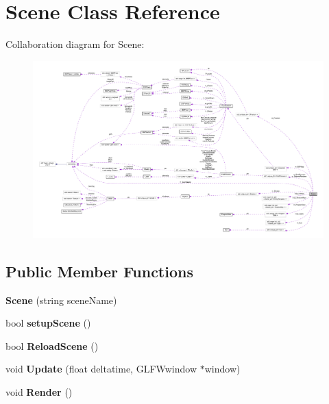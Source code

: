 \hypertarget{class_scene}{}\section{Scene Class Reference}
\label{class_scene}


Collaboration diagram for Scene\+:
\nopagebreak
\begin{figure}[H]
\begin{center}
\leavevmode
\includegraphics[width=350pt]{class_scene__coll__graph}
\end{center}
\end{figure}
\subsection*{Public Member Functions}
\begin{DoxyCompactItemize}
\item 
{\bfseries Scene} (string scene\+Name)\hypertarget{class_scene_a560981a699d1a725c5d80830fc32cd9a}{}\label{class_scene_a560981a699d1a725c5d80830fc32cd9a}

\item 
bool {\bfseries setup\+Scene} ()\hypertarget{class_scene_a6b806d01f6b3bcdfc47f6fb918ddfc75}{}\label{class_scene_a6b806d01f6b3bcdfc47f6fb918ddfc75}

\item 
bool {\bfseries Reload\+Scene} ()\hypertarget{class_scene_ae539c6790a579e51420966ffaefb0f84}{}\label{class_scene_ae539c6790a579e51420966ffaefb0f84}

\item 
void {\bfseries Update} (float deltatime, G\+L\+F\+Wwindow $\ast$window)\hypertarget{class_scene_ab12a3c580f885981907b5813a4b4b22b}{}\label{class_scene_ab12a3c580f885981907b5813a4b4b22b}

\item 
void {\bfseries Render} ()\hypertarget{class_scene_a91913b921d41d374e00eac347358dc14}{}\label{class_scene_a91913b921d41d374e00eac347358dc14}

\end{DoxyCompactItemize}
